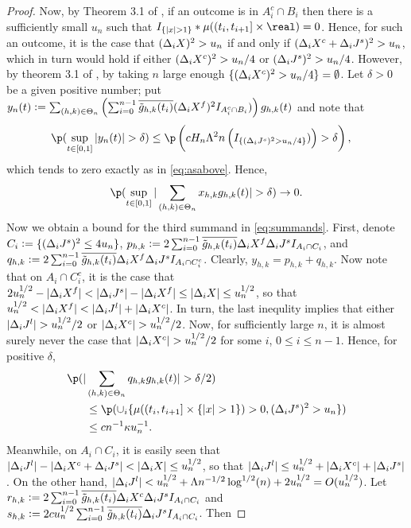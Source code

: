 \begin{proof}
Now, by Theorem 3.1 of \cite{Mancini2009}, if an outcome is  in $A_i^c \cap B_i$ then there is a sufficiently small $u_n$ such that $I_{\{\vert x \vert > 1\}} \ast \mu((t_i , t_{i + 1}  ] \times \real) = 0$. Hence, for such an outcome, it is the case that $ (\Delta_i X)^2> u_n$ if and only if  $ (\Delta_i X^c + \Delta_i J^s)^2 > u_n$, which  in turn would hold if either $(\Delta_i X^c)^2 > u_n/4$ or   $(\Delta_i J^s)^2 > u_n/4$. However, by theorem 3.1 of \cite{Mancini2009}, by taking $n$ large enough $\{ (\Delta_i X^c)^2 > u_n/4 \} = \emptyset$. Let $\delta > 0$ be a given positive number; put $y_n(t) :=    \sum_{(h,k) \in \Theta_n}\left(\sum_{i = 0}^{n-1}  \overline{\tilde{g}_{h,k}(t_i)}(\Delta_i X^f)^2 I_{A_i^c \cap B_i})\right)g_{h,k}(t)$ and note that 
\begin{align}
  \p&(\sup_{t \in \domain}\vert y_n(t) \vert > \delta) \le \p\left(cH_n \Lambda^2n \left( I_{\{(\djt)^2 >u_n/4\}})\right) > \delta\right), \notag
  \label{}
\end{align}
which tends to zero exactly as in \eqref{eq:asabove}. Hence, \begin{align}\label{eq:x} \p(\sup_{t \in [0,1]}\vert \sumt x_{h,k} \ghk(t) \vert > \delta) \to 0. \end{align}
Now we obtain a bound for the third summand in  \eqref{eq:summands}. First, denote $C_i := \{( \Delta_i J^s )^2 \le 4 u_n\}$, $p_{h,k} : = 2 \sum_{i = 0}^{n-1} \overline{\tilde{g}_{h,k}(t_i)}\Delta_i X^f \Delta_i J^s I_{A_i \cap C_i}$, and $q_{h,k} := 2 \sum_{i = 0}^{n-1} \overline{\tilde{g}_{h,k}(t_i)}\Delta_i X^f \Delta_i J^s I_{A_i \cap C_i^c}$. Clearly, $y_{h,k} = p_{h,k} + q_{h,k}$. Now note that on $ A_i \cap C_i^c$, it is the case that  $2u_n^{1/2} - \vert \Delta_i X^f \vert < \vert \Delta_i J^s\vert - \vert \Delta_i X^f\vert \le \vert \Delta_i X \vert \le u_n^{1/2}$, so that $u_n^{1/2} < \vert \Delta_i X^f \vert < \vert \Delta_i J^l \vert + \vert \Delta_i X^c \vert$. In turn, the last inequlity implies that either $\vert \Delta_i J^l \vert > u^{1/2}_n/2$ or  $\vert \Delta_i X^c \vert > u^{1/2}_n/2$. Now, for sufficiently large $n$, it is almost surely never the case that $\vert \Delta_i X^c \vert > u^{1/2}_n/2$ for some $i$,  $0 \le  i  \le n -1$. Hence,  for positive $\delta$, \begin{align} \p(\vert&\sumt q_{h,k} \ghk(t) \vert > \delta/2) \notag \\ &\le \p(    \cup_i\{ \mu( (t_i, t_{i+1}] \times \{\vert x \vert > 1 \} ) > 0,  (\djt)^2 > u_n\}) \notag \\ & \le c n^{-1} \kappa u_n^{-1}.\end{align}
Meanwhile, on $A_i \cap C_i$, it is easily seen that $\vert \Delta_i J^l \vert - \vert \Delta_i X^c + \Delta_i J^s \vert < \vert \Delta_i X \vert \le u_n^{1/2}$, so that $\vert \Delta_i J^l\vert \le u^{1/2}_n + \vert \Delta_i X^c \vert + \vert \Delta_i J^s\vert$. On the other hand, $ \vert \Delta_i J^l \vert < u_n^{1/2} + \Lambda n^{-1/2} \log^{1/2}(n) + 2 u_n^{1/2} = O(u^{1/2}_n)$. Let $r_{h,k} :=  2 \sum_{i = 0}^{n-1} \overline{\tilde{g}_{h,k}(t_i)}\Delta_i X^c \Delta_i J^s I_{A_i \cap C_i}$ and $s_{h,k} := 2 c u_n^{1/2}\sum_{i = 0}^{n-1} \overline{\tilde{g}_{h,k}(t_i)} \Delta_i J^s I_{A_i \cap C_i}$. Then 

\end{proof}
